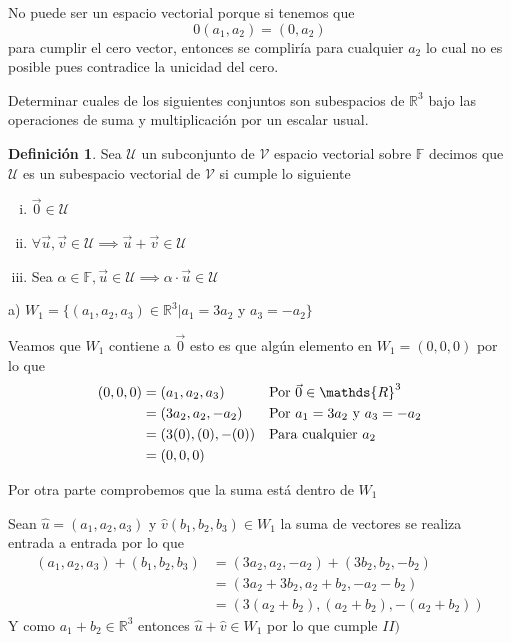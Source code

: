 \documentclass[letterpaper]{article}
\newcommand{\F}{\mathds{F}}
\newcommand{\R}{\mathds{R}}
\renewcommand{\*}{\cdot}
\theoremstyle{definition}
\newtheorem{definition}{Definición}
\begin{document}
No puede ser un espacio vectorial porque si tenemos que \[ 0(a_1, a_2) = (0, a_2)  \] para cumplir el cero vector, entonces se compliría para cualquier $a_2$ lo cual no es posible pues contradice la unicidad del cero.\\

\begin{ejercicio}{5}
	Determinar cuales de los siguientes conjuntos son subespacios de $\mathbb{R}^{3}$ bajo las operaciones de suma y multiplicación por un escalar usual.
\end{ejercicio}
\begin{definition}
	Sea $ \mathcal{U} $ un subconjunto de $ \mathcal{V}$ espacio vectorial sobre $ \F $ decimos que $ \mathcal{U} $ es un subespacio vectorial de $ \mathcal{V} $ si cumple lo siguiente
	
	\begin{enumerate}[i)]
		\item $ \vec{0}  \in \mathcal{U} $
		\item $ \forall \vec{u}, \vec{v} \in \mathcal{U} \implies \vec{u} + \vec{v} \in \mathcal{U} $
		\item Sea $ \alpha \in \F, \vec{u} \in \mathcal{U} \implies \alpha \* \vec{u} \in \mathcal{U} $
	\end{enumerate}
	   
\end{definition}

a) $W_{1} = \lbrace (a_{1},a_{2},a_{3}) \in \mathbb{R}^{3} \big\vert  a_{1}=3a_{2}$ y $a_{3}=-a_{2} \rbrace$

Veamos que $ W_{1} $ contiene a $ \vec{0} $ esto es que algún elemento en $ W_{1} = (0,0,0) $ por lo que 
	\begin{align*}
		(0,0,0) &= (a_{1},a_{2},a_{3}) && \text{Por $ \vec{0} \in \R^3 $}\\
		&= (3a_{2},a_{2},-a_{2}) && \text{Por $a_{1}=3a_{2}$ y $a_{3}=-a_{2}$}\\
		&= (3(0),(0),-(0)) && \text{Para cualquier $ a_2 $}\\
		&= (0,0,0)
	\end{align*}
	
Por otra parte comprobemos que la suma está dentro de $ W_1 $ 

Sean $ \hat{u} = (a_{1},a_{2},a_{3})  $ y $\hat{v} (b_{1},b_{2},b_{3})  \in W_1$ la suma de vectores se realiza entrada a entrada por lo que
\begin{align*}
	(a_{1},a_{2},a_{3}) + (b_{1},b_{2},b_{3}) &= (3a_{2},a_{2},-a_{2}) + (3b_{2},b_{2},-b_{2})\\
	&= (3 a_2 + 3b_2, a_2 + b_2, -a_2 - b_2)\\
	&= (3( a_2 + b_2), (a_2 + b_2), -(a_2 +b_2))
\end{align*}
 Y como $ a_1 + b_2 \in \R^3$ entonces $ \hat{u} + \hat{v} \in W_1 $ por lo que cumple $ II) $\\
 
\end{document}
